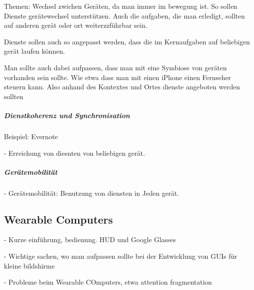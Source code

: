 Themen: Wechsel zwichen Geräten, da man immer im bewegung ist. So sollen Dienste gerätewechsel unterstützen. Auch die aufgaben, die man erledigt, sollten auf anderen gerät oder ort weiterzzführbar sein.

Dienste sollen auch so angepasst werden, dass die im Kernaufgaben auf beliebigen gerät laufen können.

Man sollte auch dabei aufpassen, dass man mit eine Symbiose von geräten vorhanden sein sollte. Wie etwa dass man mit einen iPhone einen Fernseher steuern kann. Also anhand des Kontextes und Ortes dienste angeboten werden sollten

\subparagraph{Dienstkoherenz und Synchronisation} %
\label{subp:diensmobilit_t}

Beispiel: Evernote

- Erreichung von diesnten von beliebigen gerät.

\subparagraph{Gerätemobilität} %
\label{subp:ger_temobilit_t}

- Gerätemobilität: Benutzung von diensten in Jeden gerät. 


\subsection{Wearable Computers} %
\label{sub:wearable_computers}

- Kurze einführung, bedienung. HUD und Google Glasses

- Wichtige sachen, wo man aufpassen sollte bei der Entwicklung von GUIs für kleine bildshirme

- Probleme beim Wearable COmputers, etwa attention fragmentation



